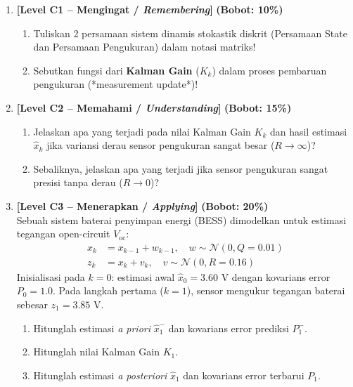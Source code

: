 \documentclass[11pt,a4paper]{article}
\begin{document}
\begin{enumerate}[leftmargin=1.5em, label=\textbf{Soal \arabic*.}]

    \item \textbf{[Level C1 -- Mengingat / \textit{Remembering}]} \hfill \textbf{(Bobot: 10\%)}
    \begin{enumerate}[label=\alph*.]
        \item Tuliskan 2 persamaan sistem dinamis stokastik diskrit (Persamaan State dan Persamaan Pengukuran) dalam notasi matriks!
        \item Sebutkan fungsi dari \textbf{Kalman Gain} ($K_k$) dalam proses pembaruan pengukuran (*measurement update*)!
    \end{enumerate}

    \vspace{0.3cm}

    \item \textbf{[Level C2 -- Memahami / \textit{Understanding}]} \hfill \textbf{(Bobot: 15\%)}
    \begin{enumerate}[label=\alph*.]
        \item Jelaskan apa yang terjadi pada nilai Kalman Gain $K_k$ dan hasil estimasi $\hat{x}_k$ jika variansi derau sensor pengukuran sangat besar ($R \to \infty$)?
        \item Sebaliknya, jelaskan apa yang terjadi jika sensor pengukuran sangat presisi tanpa derau ($R \to 0$)?
    \end{enumerate}

    \vspace{0.3cm}

    \item \textbf{[Level C3 -- Menerapkan / \textit{Applying}]} \hfill \textbf{(Bobot: 20\%)} \\
    Sebuah sistem baterai penyimpan energi (BESS) dimodelkan untuk estimasi tegangan open-circuit $V_{\text{oc}}$:
    \begin{align*}
        x_k &= x_{k-1} + w_{k-1}, \quad w \sim \mathcal{N}(0, Q=0.01) \\
        z_k &= x_k + v_k, \quad v \sim \mathcal{N}(0, R=0.16)
    \end{align*}
    Inisialisasi pada $k=0$: estimasi awal $\hat{x}_0 = 3.60$ V dengan kovarians error $P_0 = 1.0$. Pada langkah pertama ($k=1$), sensor mengukur tegangan baterai sebesar $z_1 = 3.85$ V.
    \begin{enumerate}[label=\alph*.]
        \item Hitunglah estimasi \textit{a priori} $\hat{x}_1^-$ dan kovarians error prediksi $P_1^-$.
        \item Hitunglah nilai Kalman Gain $K_1$.
        \item Hitunglah estimasi \textit{a posteriori} $\hat{x}_1$ dan kovarians error terbarui $P_1$.
    \end{enumerate}


\end{enumerate}
\end{document}
